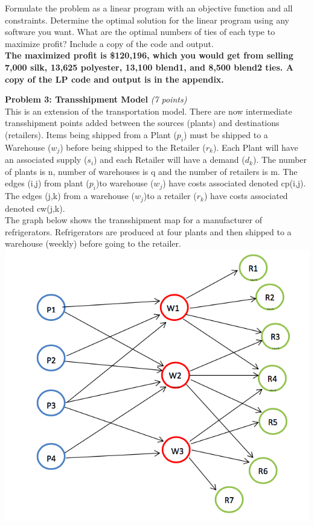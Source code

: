 \documentclass{article}
\begin{document}
\noindent Formulate the problem as a linear program with an objective function and all constraints. Determine the optimal solution for the linear program using any software you want. What are the optimal numbers of ties of each type to maximize profit? Include a copy of the code and output.\\[.25cm]

\textbf{The maximized profit is \$120,196, which you would get from selling 7,000 silk, 13,625 polyester, 13,100 blend1, and 8,500 blend2 ties. A copy of the LP code and output is in the appendix.}
\\[.25cm]

\newpage

\noindent \textbf{Problem 3: Transshipment Model} \textit{(7 points)}\\ This is an extension of the transportation model. There are now intermediate transshipment points added between the sources (plants) and destinations (retailers). Items being shipped from a Plant ($p_i$) must be shipped to a Warehouse ($w_j$) before being shipped to the Retailer ($r_k$). Each Plant will have an associated supply ($s_i$) and each Retailer will have a demand ($d_k$). The number of plants is n, number of warehouses is q and the number of retailers is m. The edges (i,j) from plant ($p_i$)to warehouse ($w_j$) have costs associated denoted cp(i,j). The edges (j,k) from a warehouse ($w_j$)to a retailer ($r_k$) have costs associated denoted cw(j,k).
\\[.25cm]

The graph below shows the transshipment map for a manufacturer of refrigerators. Refrigerators are produced at four plants and then shipped to a warehouse (weekly) before going to the retailer.
\\[.25cm]

\includegraphics[scale=.5]{TRANS}\\
\end{document}
